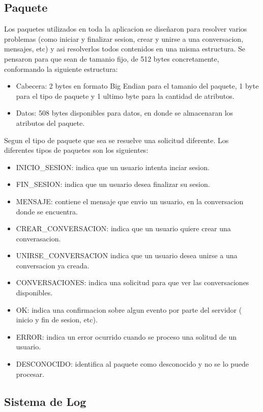 \documentclass[a4paper,12pt,titlepage]{article}
\begin{document}
\subsection{Paquete}

Los paquetes utilizados en toda la aplicacion se diseñaron para resolver varios problemas (como iniciar y finalizar sesion, crear y unirse a una conversacion, mensajes, etc) y asi resolverlos todos contenidos en una misma estructura.
Se pensaron para que sean de tamanio fijo, de 512 bytes concretamente, conformando la siguiente estructura:

\begin{itemize}
\item Cabecera: 2 bytes en formato Big Endian para el tamanio del paquete, 1 byte para el tipo de paquete y 1 ultimo byte para la cantidad de atributos.
\item Datos: 508 bytes disponibles para datos, en donde se almacenaran los atributos del paquete.\\
\end{itemize}

Segun el tipo de paquete que sea se resuelve una solicitud diferente. Los diferentes tipos de paquetes son los siguientes:
\begin{itemize}
\item INICIO\_SESION: indica que un usuario intenta inciar sesion.
\item FIN\_SESION: indica que un usuario desea finalizar su sesion.
\item MENSAJE: contiene el mensaje que envio un usuario, en la conversacion donde se encuentra.
\item CREAR\_CONVERSACION: indica que un usuario quiere crear una converasacion.
\item UNIRSE\_CONVERSACION indica que un usuario desea unirse a una conversacion ya creada.
\item CONVERSACIONES: indica una solicitud para que ver las conversaciones disponibles.
\item OK: indica una confirmacion sobre algun evento por parte del servidor ( inicio y fin de sesion, etc).
\item ERROR: indica un error ocurrido cuando se proceso una solitud de un usuario.
\item DESCONOCIDO: identifica al paquete como desconocido y no se lo puede procesar.

\end{itemize}

\subsection{Sistema de Log}
\end{document}
